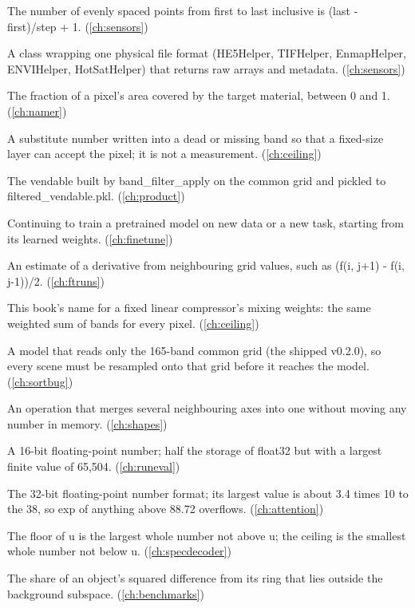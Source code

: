 \begin{description}[style=nextline,leftmargin=1.2em,font=\normalfont\bfseries]
\item[Fencepost formula] The number of evenly spaced points from first to last inclusive is (last - first)/step + 1. (\cref{ch:sensors})
\item[FileHelper] A class wrapping one physical file format (HE5Helper, TIFHelper, EnmapHelper, ENVIHelper, HotSatHelper) that returns raw arrays and metadata. (\cref{ch:sensors})
\item[Fill] The fraction of a pixel's area covered by the target material, between 0 and 1. (\cref{ch:namer})
\item[Fill value] A substitute number written into a dead or missing band so that a fixed-size layer can accept the pixel; it is not a measurement. (\cref{ch:ceiling})
\item[Filtered vendable] The vendable built by band\_filter\_apply on the common grid and pickled to filtered\_vendable.pkl. (\cref{ch:product})
\item[Fine-tuning] Continuing to train a pretrained model on new data or a new task, starting from its learned weights. (\cref{ch:finetune})
\item[Finite difference] An estimate of a derivative from neighbouring grid values, such as (f(i, j+1) - f(i, j-1))/2. (\cref{ch:ftruns})
\item[Fixed recipe] This book's name for a fixed linear compressor's mixing weights: the same weighted sum of bands for every pixel. (\cref{ch:ceiling})
\item[Fixed-grid model] A model that reads only the 165-band common grid (the shipped v0.2.0), so every scene must be resampled onto that grid before it reaches the model. (\cref{ch:sortbug})
\item[Flatten] An operation that merges several neighbouring axes into one without moving any number in memory. (\cref{ch:shapes})
\item[Float16] A 16-bit floating-point number; half the storage of float32 but with a largest finite value of 65,504. (\cref{ch:runeval})
\item[Float32] The 32-bit floating-point number format; its largest value is about 3.4 times 10 to the 38, so exp of anything above 88.72 overflows. (\cref{ch:attention})
\item[Floor and ceiling] The floor of u is the largest whole number not above u; the ceiling is the smallest whole number not below u. (\cref{ch:specdecoder})
\item[Foreign fraction] The share of an object's squared difference from its ring that lies outside the background subspace. (\cref{ch:benchmarks})

\end{description}
